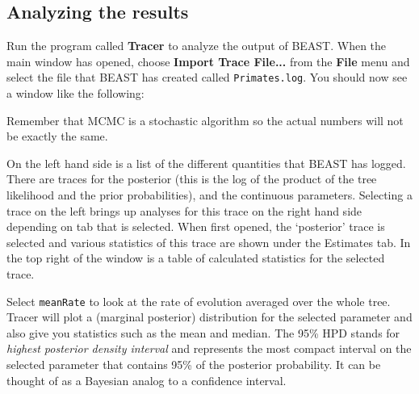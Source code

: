 \documentclass[12pt]{article}
\begin{document}
\subsection*{Analyzing the results}

Run the program called {\bf Tracer} to analyze the output of BEAST. When the main
window has opened, choose {\bf Import Trace File...} from the {\bf File} menu and select the file that
BEAST has created called \texttt{Primates.log}.
You should now see a window like the following:

\medskip{}


\medskip{}

Remember that MCMC is a stochastic algorithm so the actual numbers will not be exactly the same.

On the left hand side is a list of the different quantities that BEAST has logged. 
There are traces for the posterior (this
is the log of the product of the tree likelihood and the prior probabilities), and the continuous parameters. Selecting a trace
on the left brings up analyses for this trace on the right hand side depending on tab that is selected. When first opened, the
`posterior' trace is selected and various statistics of this trace are shown under the Estimates tab.
In the top right of the window is a table of calculated statistics for the selected trace. 

Select \texttt{meanRate} to look at
the rate of evolution averaged over the whole tree. Tracer will plot a (marginal posterior) distribution for the selected parameter and also give you
statistics such as the mean and median. The 95\% HPD stands for {\it highest posterior density interval} and represents the most compact interval on the selected parameter that contains 95\% of the posterior probability. It can be thought of as a Bayesian analog to a confidence interval. 
\end{document}
